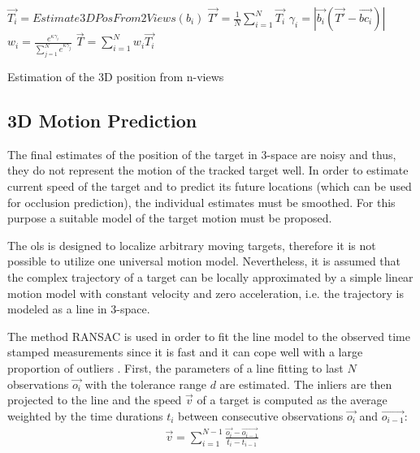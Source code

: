 \begin{algorithm}
	\SetAlgoNoLine	
	\DontPrintSemicolon
	\BlankLine
	
	{
		$\vec{T_{i}} = Estimate3DPosFrom2Views(b_{i})$\;
	}
	$\vec{T'} = \frac{1}{N}\sum_{i=1}^{N}\vec{T_{i}}$\;	
	{
		$\gamma_{i} = |\vec{b_{i}}(\vec{T'} - \vec{bc_{i}})|$\;
		$w_{i} = \frac{e^{\kappa\gamma_{i}}}{\sum_{j=1}^{N}e^{\kappa\gamma_{j}}}$\;
	}
	$\vec{T} = \sum_{i=1}^{N}w_{i}\vec{T_{i}}$	
	\caption{Estimation of the 3D position from n-views}
	\label{alg:3dPosEstimation}
\end{algorithm}


\subsection{3D Motion Prediction} \label{txt:3d_motion_predicition}

The final estimates of the position of the target in 3-space are noisy and thus, they do not represent the motion of the tracked target well. In order to estimate current speed of the target and to predict its future locations (which can be used for occlusion prediction), the individual estimates must be smoothed. For this purpose a suitable model of the target motion must be proposed.

The \gls{ols} is designed to localize arbitrary moving targets, therefore it is not possible to utilize one universal motion model. Nevertheless, it is assumed that the complex trajectory of a target can be locally approximated by a simple linear motion model with constant velocity and zero acceleration, i.e. the trajectory is modeled as a line in 3-space.

The method RANSAC is used in order to fit the line model to the observed time stamped measurements since it is fast and it can cope well with a large proportion of outliers \cite{Hartley:2003:MVG:861369}. First, the parameters of a line fitting to last $N$ observations $\vec{o_{i}}$ with the tolerance range $d$ are estimated. The inliers are then projected to the line and the speed $\vec{v}$ of a target is computed as the average weighted by the time durations $t_{i}$ between consecutive observations $\vec{o_{i}}$ and $\vec{o_{i-1}}$:
\begin{align}
	\vec{v} = \sum_{i=1}^{N-1}{\frac{\vec{o_{i}} - \vec{o_{i-1}}}{t_{i} - t_{i-1}}}
\end{align}

